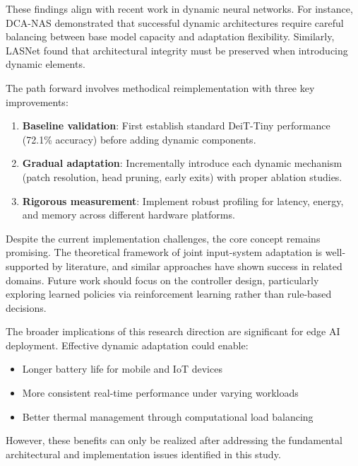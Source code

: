 \documentclass{article}
\begin{document}
These findings align with recent work in dynamic neural networks. For instance, DCA-NAS \cite{dca-nas} demonstrated that successful dynamic architectures require careful balancing between base model capacity and adaptation flexibility. Similarly, LASNet \cite{lasnet} found that architectural integrity must be preserved when introducing dynamic elements.

The path forward involves methodical reimplementation with three key improvements:
\begin{enumerate}
    \item \textbf{Baseline validation}: First establish standard DeiT-Tiny performance (72.1\% accuracy) before adding dynamic components.
    \item \textbf{Gradual adaptation}: Incrementally introduce each dynamic mechanism (patch resolution, head pruning, early exits) with proper ablation studies.
    \item \textbf{Rigorous measurement}: Implement robust profiling for latency, energy, and memory across different hardware platforms.
\end{enumerate}

Despite the current implementation challenges, the core concept remains promising. The theoretical framework of joint input-system adaptation is well-supported by literature, and similar approaches have shown success in related domains. Future work should focus on the controller design, particularly exploring learned policies via reinforcement learning rather than rule-based decisions.

The broader implications of this research direction are significant for edge AI deployment. Effective dynamic adaptation could enable:
\begin{itemize}
    \item Longer battery life for mobile and IoT devices
    \item More consistent real-time performance under varying workloads
    \item Better thermal management through computational load balancing
\end{itemize}

However, these benefits can only be realized after addressing the fundamental architectural and implementation issues identified in this study.
\end{document}
